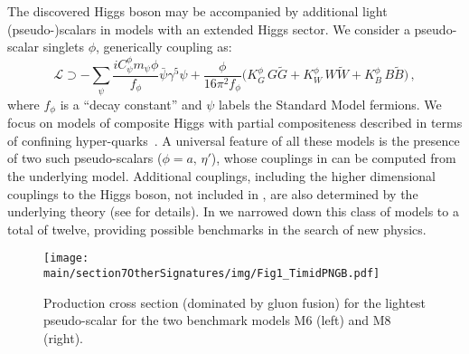 \subsubsection{}



The discovered Higgs boson may be accompanied by additional light (pseudo-)scalars in models with an extended Higgs sector. We consider a pseudo-scalar singlets $\phi$, generically coupling as:
\begin{equation}
 {\mathcal{L}} \supset - \sum_\psi \frac{i C^\phi_\psi m_\psi \phi}{f_\phi} \bar \psi \gamma^5 \psi
+ \frac{\phi}{16\pi^2 f_\phi}\bigg(K^\phi_{G}\, G\tilde G + K^\phi_W\,  W \tilde{W} +K^\phi_B\, B \tilde B\bigg)\,, \label{eq:lagrTCP}
\end{equation}
where $f_\phi$ is a ``decay constant'' and $\psi$ labels the Standard Model fermions.
We focus on models of composite Higgs with partial compositeness described in terms of confining hyper-quarks~\cite{Ferretti:2013kya}. A universal feature of all these models is the presence of two such pseudo-scalars ($\phi= a, \,\eta'$), whose couplings  in  can be computed from the underlying model.  Additional couplings, including the higher dimensional couplings to the Higgs boson, not included in , are also determined by the underlying theory (see  for details). In  we narrowed down this class of models to a total of twelve, providing possible benchmarks in the search of new physics. 

\begin{figure*}[t] 
\begin{center}
\texttt{[image: \\main/section7OtherSignatures/img/Fig1\_TimidPNGB.pdf]} 
\end{center}
\caption{\label{fig:Fig1TPNGB} Production cross section (dominated by gluon fusion) for the lightest pseudo-scalar for the two benchmark models M6 (left) and M8 (right).}
\end{figure*}



